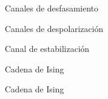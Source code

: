 \begin{frame}{Canales de desfasamiento}
    \lipsum[1]
\end{frame}

\begin{frame}{Canales de despolarización}
    \lipsum[1]
\end{frame}

\begin{frame}{Canal de estabilización}
    \lipsum[1]
\end{frame}


\begin{frame}{Cadena de Ising}
    \lipsum[1]
\end{frame}

\begin{frame}{Cadena de Ising}
    \lipsum[1]
\end{frame}